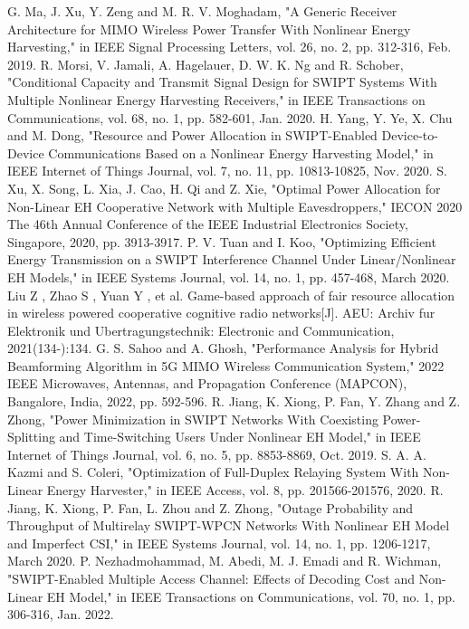 \documentclass[conference]{IEEEtran}
\begin{document}
\begin{thebibliography}{00}
 G. Ma, J. Xu, Y. Zeng and M. R. V. Moghadam, "A Generic Receiver Architecture for MIMO Wireless Power Transfer With Nonlinear Energy Harvesting," in IEEE Signal Processing Letters, vol. 26, no. 2, pp. 312-316, Feb. 2019.
 R. Morsi, V. Jamali, A. Hagelauer, D. W. K. Ng and R. Schober, "Conditional Capacity and Transmit Signal Design for SWIPT Systems With Multiple Nonlinear Energy Harvesting Receivers," in IEEE Transactions on Communications, vol. 68, no. 1, pp. 582-601, Jan. 2020.
 H. Yang, Y. Ye, X. Chu and M. Dong, "Resource and Power Allocation in SWIPT-Enabled Device-to-Device Communications Based on a Nonlinear Energy Harvesting Model," in IEEE Internet of Things Journal, vol. 7, no. 11, pp. 10813-10825, Nov. 2020.
 S. Xu, X. Song, L. Xia, J. Cao, H. Qi and Z. Xie, "Optimal Power Allocation for Non-Linear EH Cooperative Network with Multiple Eavesdroppers," IECON 2020 The 46th Annual Conference of the IEEE Industrial Electronics Society, Singapore, 2020, pp. 3913-3917.
 P. V. Tuan and I. Koo, "Optimizing Efficient Energy Transmission on a SWIPT Interference Channel Under Linear/Nonlinear EH Models," in IEEE Systems Journal, vol. 14, no. 1, pp. 457-468, March 2020.
 Liu Z ,  Zhao S ,  Yuan Y , et al. Game-based approach of fair resource allocation in wireless powered cooperative cognitive radio networks[J]. AEU: Archiv fur Elektronik und Ubertragungstechnik: Electronic and Communication, 2021(134-):134.
 G. S. Sahoo and A. Ghosh, "Performance Analysis for Hybrid Beamforming Algorithm in 5G MIMO Wireless Communication System," 2022 IEEE Microwaves, Antennas, and Propagation Conference (MAPCON), Bangalore, India, 2022, pp. 592-596.
 R. Jiang, K. Xiong, P. Fan, Y. Zhang and Z. Zhong, "Power Minimization in SWIPT Networks With Coexisting Power-Splitting and Time-Switching Users Under Nonlinear EH Model," in IEEE Internet of Things Journal, vol. 6, no. 5, pp. 8853-8869, Oct. 2019.
 S. A. A. Kazmi and S. Coleri, "Optimization of Full-Duplex Relaying System With Non-Linear Energy Harvester," in IEEE Access, vol. 8, pp. 201566-201576, 2020.
 R. Jiang, K. Xiong, P. Fan, L. Zhou and Z. Zhong, "Outage Probability and Throughput of Multirelay SWIPT-WPCN Networks With Nonlinear EH Model and Imperfect CSI," in IEEE Systems Journal, vol. 14, no. 1, pp. 1206-1217, March 2020.
 P. Nezhadmohammad, M. Abedi, M. J. Emadi and R. Wichman, "SWIPT-Enabled Multiple Access Channel: Effects of Decoding Cost and Non-Linear EH Model," in IEEE Transactions on Communications, vol. 70, no. 1, pp. 306-316, Jan. 2022.

\end{thebibliography}
\end{document}

